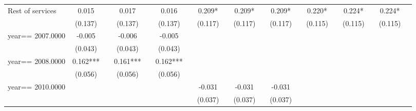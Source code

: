 \begin{table}[htbp]
\begin{tabular}{l*{18}{c}}
Rest of services    &       0.015   &               &       0.017   &               &       0.016   &               &       0.209*  &               &       0.209*  &               &       0.209*  &               &       0.220*  &               &       0.224*  &               &       0.224*  &               \\
                    &     (0.137)   &               &     (0.137)   &               &     (0.137)   &               &     (0.117)   &               &     (0.117)   &               &     (0.117)   &               &     (0.115)   &               &     (0.115)   &               &     (0.115)   &               \\
year==  2007.0000   &      -0.005   &               &      -0.006   &               &      -0.005   &               &               &               &               &               &               &               &               &               &               &               &               &               \\
                    &     (0.043)   &               &     (0.043)   &               &     (0.043)   &               &               &               &               &               &               &               &               &               &               &               &               &               \\
year==  2008.0000   &       0.162***&               &       0.161***&               &       0.162***&               &               &               &               &               &               &               &               &               &               &               &               &               \\
                    &     (0.056)   &               &     (0.056)   &               &     (0.056)   &               &               &               &               &               &               &               &               &               &               &               &               &               \\
year==  2010.0000   &               &               &               &               &               &               &      -0.031   &               &      -0.031   &               &      -0.031   &               &               &               &               &               &               &               \\
                    &               &               &               &               &               &               &     (0.037)   &               &     (0.037)   &               &     (0.037)   &               &               &               &               &               &               &               \\

\end{tabular}
\end{table}
